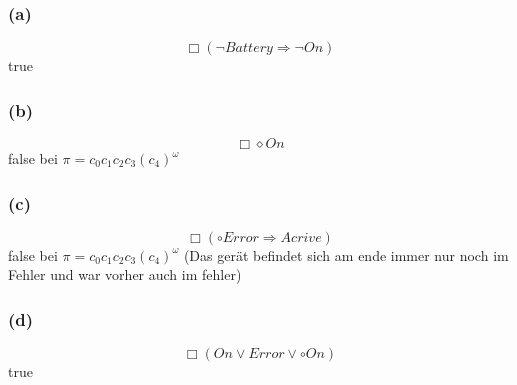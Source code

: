 \subsubsection*{(a)}

\[\Box(\neg Battery\Rightarrow\neg On)\]
true
\subsubsection*{(b)}
\[\Box\diamond On\]
false bei $\pi= c_0c_1c_2c_3(c_4)^\omega$
\subsubsection*{(c)}
\[\Box ( \circ Error \Rightarrow Acrive)\]
false bei $\pi= c_0c_1c_2c_3(c_4)^\omega$
(Das gerät befindet sich am ende immer nur noch im Fehler und war vorher auch im fehler)
\subsubsection*{(d)}
\[\Box (On\vee Error \vee \circ On)\]
true
